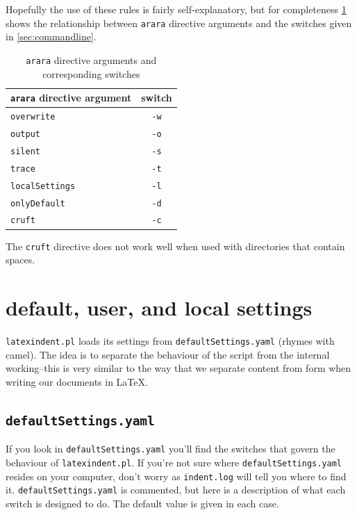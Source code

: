 \documentclass[11pt]{article}
\begin{document}
Hopefully the use of these rules is fairly self-explanatory, but for completeness
\cref{tab:orbsandswitches} shows the relationship between \lstinline!arara! directive arguments and the
switches given in \cref{sec:commandline}.

\begin{table}[!ht]
	\centering
	\caption{\lstinline!arara! directive arguments and corresponding switches}
	\label{tab:orbsandswitches}
	\begin{tabular}{lc}
		\toprule
		\lstinline!arara! directive argument & switch         \\
		\midrule
		\lstinline!overwrite!                & \lstinline!-w! \\
		\lstinline!output!                   & \lstinline!-o! \\
		\lstinline!silent!                   & \lstinline!-s! \\
		\lstinline!trace!                    & \lstinline!-t! \\
		\lstinline!localSettings!            & \lstinline!-l! \\
		\lstinline!onlyDefault!              & \lstinline!-d! \\
		\lstinline!cruft!                    & \lstinline!-c! \\
		\bottomrule
	\end{tabular}
\end{table}

The \lstinline!cruft! directive does not work well when used with
directories that contain spaces.

\section{default, user, and local settings}\label{sec:defuseloc}
\lstinline!latexindent.pl! loads its settings from \lstinline!defaultSettings.yaml!
(rhymes with camel). The idea is to separate the behaviour of the script
from the internal working--this is very similar to the way that we separate content
from form when writing our documents in \LaTeX.

\subsection{\lstinline!defaultSettings.yaml!}
If you look in \lstinline!defaultSettings.yaml! you'll find the switches
that govern the behaviour of \lstinline!latexindent.pl!. If you're not sure where
\lstinline!defaultSettings.yaml! resides on your computer, don't worry as \lstinline!indent.log!
will tell you where to find it.
\lstinline!defaultSettings.yaml! is commented,
but here is a description of what each switch is designed to do. The default
value is given in each case.
\end{document}
